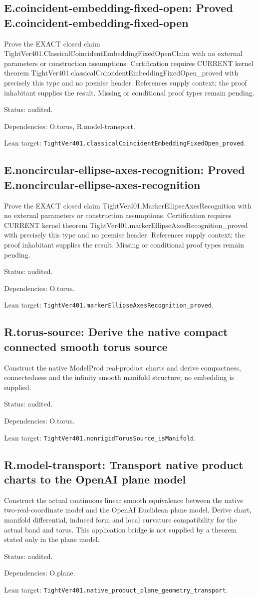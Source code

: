 \documentclass{article}
\begin{document}
\subsection*{E.coincident-embedding-fixed-open: Proved E.coincident-embedding-fixed-open}
Prove the EXACT closed claim TightVer401.ClassicalCoincidentEmbeddingFixedOpenClaim with no external parameters or construction assumptions. Certification requires CURRENT kernel theorem TightVer401.classicalCoincidentEmbeddingFixedOpen\_proved with precisely this type and no premise header. References supply context; the proof inhabitant supplies the result. Missing or conditional proof types remain pending.
\par Status: audited.
\par Dependencies: O.torus, R.model-transport.
\par Lean target: \texttt{TightVer401.classicalCoincidentEmbeddingFixedOpen\_proved}.
\subsection*{E.noncircular-ellipse-axes-recognition: Proved E.noncircular-ellipse-axes-recognition}
Prove the EXACT closed claim TightVer401.MarkerEllipseAxesRecognition with no external parameters or construction assumptions. Certification requires CURRENT kernel theorem TightVer401.markerEllipseAxesRecognition\_proved with precisely this type and no premise header. References supply context; the proof inhabitant supplies the result. Missing or conditional proof types remain pending.
\par Status: audited.
\par Dependencies: O.torus.
\par Lean target: \texttt{TightVer401.markerEllipseAxesRecognition\_proved}.
\subsection*{R.torus-source: Derive the native compact connected smooth torus source}
Construct the native ModelProd real-product charts and derive compactness, connectedness and the infinity smooth manifold structure; no embedding is supplied.
\par Status: audited.
\par Dependencies: O.torus.
\par Lean target: \texttt{TightVer401.nonrigidTorusSource\_isManifold}.
\subsection*{R.model-transport: Transport native product charts to the OpenAI plane model}
Construct the actual continuous linear smooth equivalence between the native two-real-coordinate model and the OpenAI Euclidean plane model. Derive chart, manifold differential, induced form and local curvature compatibility for the actual band and torus. This application bridge is not supplied by a theorem stated only in the plane model.
\par Status: audited.
\par Dependencies: O.plane.
\par Lean target: \texttt{TightVer401.native\_product\_plane\_geometry\_transport}.
\end{document}
